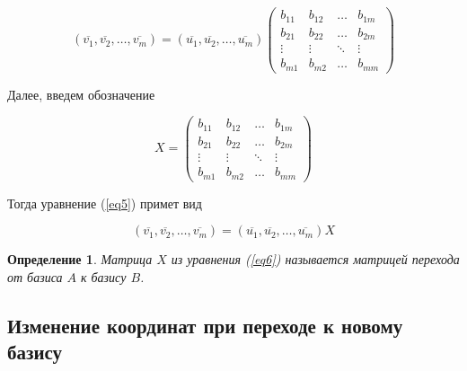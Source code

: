 \documentclass[]{article}
\theoremstyle{theorem}
\newtheorem{dfn}{Определение}
\theoremstyle{definition}
\begin{document}
\begin{equation}\label{eq5}
	(\overline{v_1},\overline{v_2},\ldots, \overline{v_m})=(\overline{u_1},\overline{u_2},\ldots, \overline{u_m})
	\begin{pmatrix}
		b_{11} & b_{12} & \ldots & b_{1m}
		\\
		b_{21} & b_{22} & \ldots & b_{2m}
		\\
		\vdots & \vdots & \ddots & \vdots
		\\
		b_{m1} & b_{m2} & \ldots & b_{mm}
	\end{pmatrix}
\end{equation}

Далее, введем обозначение


\begin{equation*}
X=	\begin{pmatrix}
	b_{11} & b_{12} & \ldots & b_{1m}
	\\
	b_{21} & b_{22} & \ldots & b_{2m}
	\\
	\vdots & \vdots & \ddots & \vdots
	\\
	b_{m1} & b_{m2} & \ldots & b_{mm}
\end{pmatrix}
\end{equation*}

Тогда уравнение (\ref{eq5}) примет вид

\begin{equation}\label{eq6}
	(\overline{v_1},\overline{v_2},\ldots, \overline{v_m})
	=
	(\overline{u_1},\overline{u_2},\ldots, \overline{u_m})X
\end{equation}

\begin{dfn}
	Матрица $X$ из уравнения (\ref{eq6}) называется матрицей перехода от базиса $A$ к базису $B$.
\end{dfn}

\subsection{Изменение координат при переходе к новому базису}
\end{document}
